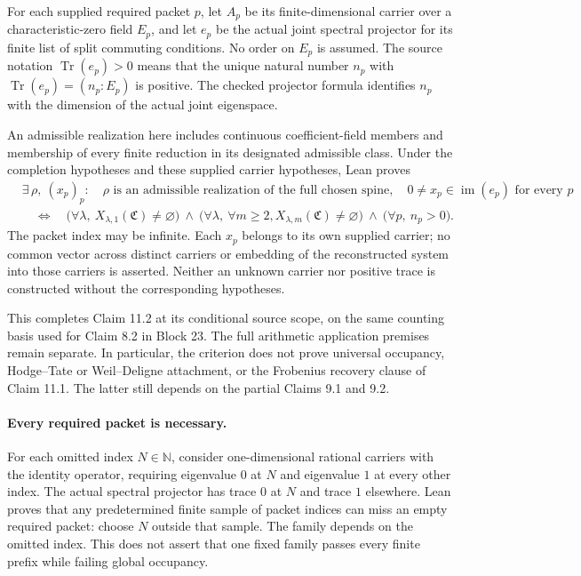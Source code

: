 \documentclass[11pt]{article}
\theoremstyle{definition}
\theoremstyle{remark}
\newcommand{\Tr}{\operatorname{Tr}}
\newcommand{\Compat}{\mathfrak C}
\begin{document}
For each supplied required packet $p$, let $A_p$ be its finite-dimensional carrier
over a characteristic-zero field $E_p$, and let $e_p$ be the actual joint spectral
projector for its finite list of split commuting conditions. No order on $E_p$
is assumed. The source notation $\Tr(e_p)>0$ means that the unique natural number
$n_p$ with $\Tr(e_p)=(n_p:E_p)$ is positive. The checked projector formula identifies
$n_p$ with the dimension of the actual joint eigenspace.

An admissible realization here includes continuous coefficient-field members and
membership of every finite reduction in its designated admissible class.
Under the completion hypotheses and these supplied carrier hypotheses, Lean proves
\[
\begin{aligned}
&\exists\,\rho,\ (x_p)_p:\quad
  \rho\text{ is an admissible realization of the full chosen spine},\quad
  0\ne x_p\in\operatorname{im}(e_p)\text{ for every }p\\
&\quad\Longleftrightarrow\quad
 \bigl(\forall\lambda,\ X_{\lambda,1}(\Compat)\ne\varnothing\bigr)
 \ \land\ \bigl(\forall\lambda,\ \forall m\ge2,
               X_{\lambda,m}(\Compat)\ne\varnothing\bigr)
 \ \land\ \bigl(\forall p,\ n_p>0\bigr).
\end{aligned}
\]
The packet index may be infinite. Each $x_p$ belongs to its own supplied carrier;
no common vector across distinct carriers or embedding of the reconstructed
system into those carriers is asserted. Neither an unknown carrier nor positive
trace is constructed without the corresponding hypotheses.

This completes Claim 11.2 at its conditional source scope, on the same counting
basis used for Claim 8.2 in Block 23. The full arithmetic application premises
remain separate. In particular, the criterion does not prove universal occupancy,
Hodge--Tate or Weil--Deligne attachment, or the Frobenius recovery clause of
Claim 11.1. The latter still depends on the partial Claims 9.1 and 9.2.

\paragraph{Every required packet is necessary.}
For each omitted index $N\in\mathbb N$, consider one-dimensional rational carriers
with the identity operator, requiring eigenvalue $0$ at $N$ and eigenvalue $1$
at every other index. The actual spectral projector has trace $0$ at $N$ and
trace $1$ elsewhere. Lean proves that any predetermined finite sample of packet
indices can miss an empty required packet: choose $N$ outside that sample.
The family depends on the omitted index. This does not assert that one fixed
family passes every finite prefix while failing global occupancy.
\end{document}
